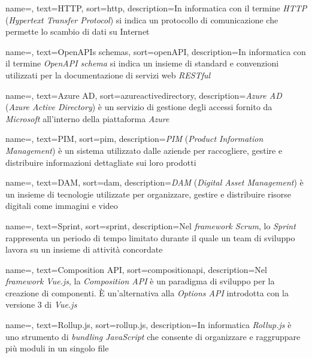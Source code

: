  {
    name=,
    text=HTTP,
    sort=http,
    description={In informatica con il termine \emph{HTTP} (\emph{Hypertext Transfer Protocol}) si indica un protocollo di comunicazione che permette lo scambio di dati su Internet}
}

 {
    name=,
    text=OpenAPIs schemas,
    sort=openAPI,
    description={In informatica con il termine \emph{OpenAPI schema} si indica un insieme di standard e convenzioni utilizzati per la documentazione di servizi web \emph{RESTful}}
}

 {
    name=,
    text=Azure AD,
    sort=azureactivedirectory,
    description={\emph{Azure AD} (\emph{Azure Active Directory}) è un servizio di gestione degli accessi fornito da \emph{Microsoft} all'interno della piattaforma \emph{Azure}}
}

 {
    name=,
    text=PIM,
    sort=pim,
    description={\emph{PIM} (\emph{Product Information Management}) è un sistema utilizzato dalle aziende per raccogliere, gestire e distribuire informazioni dettagliate sui loro prodotti}
}

 {
    name=,
    text=DAM,
    sort=dam,
    description={\emph{DAM} (\emph{Digital Asset Management}) è un insieme di tecnologie utilizzate per organizzare, gestire e distribuire risorse digitali come immagini e video}
}


 {
    name=,
    text=Sprint,
    sort=sprint,
    description={Nel \emph{framework Scrum}, lo \emph{Sprint} rappresenta un periodo di tempo limitato durante il quale un team di sviluppo lavora su un insieme di attività concordate}
}

 {
    name=,
    text=Composition API,
    sort=compositionapi,
    description={Nel \emph{framework Vue.js}, la \emph{Composition API} è un paradigma di sviluppo per la creazione di componenti. È un'alternativa alla \emph{Options API} introdotta con la versione 3 di \emph{Vue.js}}
}

 {
    name=,
    text=Rollup.js,
    sort=rollup.js,
    description={In informatica \emph{Rollup.js} è uno strumento di \emph{bundling JavaScript} che consente di organizzare e raggruppare più moduli in un singolo file}
}

